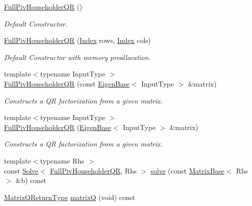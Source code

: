 \begin{DoxyCompactItemize}
\hyperlink{group___q_r___module_aeb14b4c1eef33128207b40a00bd0bd08}{Full\+Piv\+Householder\+QR} ()
\begin{DoxyCompactList}\small\item\em Default Constructor. \end{DoxyCompactList}\item 
\hyperlink{group___q_r___module_abf722e1dc7241a5d6f76460ef0c87821}{Full\+Piv\+Householder\+QR} (\hyperlink{namespace_eigen_a62e77e0933482dafde8fe197d9a2cfde}{Index} rows, \hyperlink{namespace_eigen_a62e77e0933482dafde8fe197d9a2cfde}{Index} cols)
\begin{DoxyCompactList}\small\item\em Default Constructor with memory preallocation. \end{DoxyCompactList}\item 
{\footnotesize template$<$typename Input\+Type $>$ }\\\hyperlink{group___q_r___module_aeeace3abca6b215025e94c3e098b0a97}{Full\+Piv\+Householder\+QR} (const \hyperlink{group___core___module_struct_eigen_1_1_eigen_base}{Eigen\+Base}$<$ Input\+Type $>$ \&matrix)
\begin{DoxyCompactList}\small\item\em Constructs a QR factorization from a given matrix. \end{DoxyCompactList}\item 
{\footnotesize template$<$typename Input\+Type $>$ }\\\hyperlink{group___q_r___module_ac9bdb4f7fa77c1aa16f238592c248e70}{Full\+Piv\+Householder\+QR} (\hyperlink{group___core___module_struct_eigen_1_1_eigen_base}{Eigen\+Base}$<$ Input\+Type $>$ \&matrix)
\begin{DoxyCompactList}\small\item\em Constructs a QR factorization from a given matrix. \end{DoxyCompactList}\item 
{\footnotesize template$<$typename Rhs $>$ }\\const \hyperlink{group___core___module_class_eigen_1_1_solve}{Solve}$<$ \hyperlink{group___q_r___module_class_eigen_1_1_full_piv_householder_q_r}{Full\+Piv\+Householder\+QR}, Rhs $>$ \hyperlink{group___q_r___module_a6f1b0a116c78e642e3d2a100a29d1a4a}{solve} (const \hyperlink{group___core___module_class_eigen_1_1_matrix_base}{Matrix\+Base}$<$ Rhs $>$ \&b) const
\item 
\hyperlink{group___q_r___module_struct_eigen_1_1internal_1_1_full_piv_householder_q_r_matrix_q_return_type}{Matrix\+Q\+Return\+Type} \hyperlink{group___q_r___module_aef768081c4fa1ec1902e50585a07490a}{matrixQ} (void) const

\end{DoxyCompactItemize}
